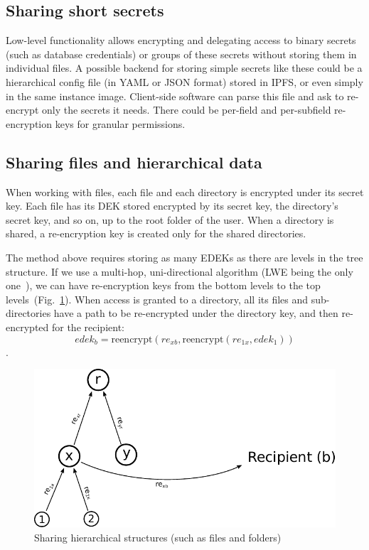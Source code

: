 \documentclass[longbibliography,nofootinbib]{revtex4-1}
\newcommand{\figref}[1]{Fig.~\ref{#1}}
\begin{document}
\subsection{Sharing short secrets}

Low-level functionality allows encrypting and delegating access to binary secrets (such as database credentials) or groups of these secrets without
storing them in individual files.
A possible backend for storing simple secrets like these could be a hierarchical config file (in YAML or JSON format) stored in IPFS,
or even simply in the same instance image.
Client-side software can parse this file and ask to re-encrypt only the secrets it needs.
There could be per-field and per-subfield re-encryption keys for granular permissions.

\subsection{Sharing files and hierarchical data}
\label{sec:hierarchical-data}

When working with files, each file and each directory is encrypted under its secret key.
Each file has its DEK stored encrypted by its secret key, the directory's secret key, and so on, up to the root folder of the user.
When a directory is shared, a re-encryption key is created only for the shared directories.

The method above requires storing as many EDEKs as there are levels in the tree structure.
If we use a multi-hop, uni-directional algorithm (LWE being the only one~\cite{lwe-reencryption}), we can have re-encryption keys from the bottom levels to
the top levels~(\figref{fig:hierarchical-pre}).
When access is granted to a directory, all its files and sub-directories have a path to be re-encrypted under the directory key, and then re-encrypted for the
recipient:
$$edek_b = \text{reencrypt}(re_{xb}, \text{reencrypt}(re_{1x}, edek_1))$$.
\begin{figure}
\centering
    \includegraphics[width=0.45\columnwidth]{pdf/hierarchical.pdf}
    \caption{Sharing hierarchical structures (such as files and folders)}
    \label{fig:hierarchical-pre}
\end{figure}
\end{document}
